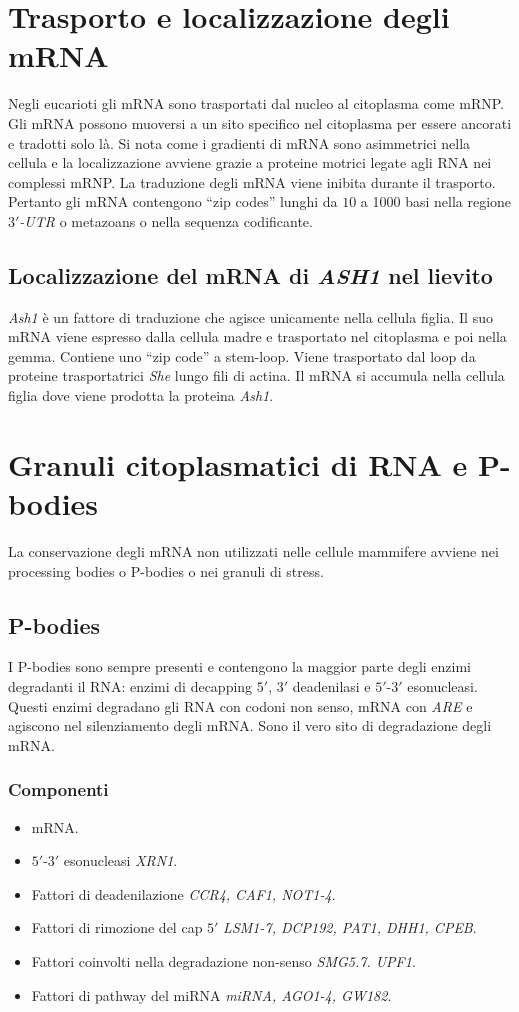 \section{Trasporto e localizzazione degli mRNA}
Negli eucarioti gli mRNA sono trasportati dal nucleo al citoplasma come mRNP. Gli mRNA possono muoversi a un sito specifico nel citoplasma per essere ancorati e tradotti solo l\`a. Si nota come i gradienti
di mRNA sono asimmetrici nella cellula e la localizzazione avviene grazie a proteine motrici legate agli RNA nei complessi mRNP. La traduzione degli mRNA viene inibita durante il trasporto. Pertanto
gli mRNA contengono ``zip codes'' lunghi da $10$ a \num{1000} basi nella regione \emph{$3'$-UTR} o metazoans o nella sequenza codificante.
\subsection{Localizzazione del mRNA di \emph{ASH1} nel lievito}
\emph{Ash1} \`e un fattore di traduzione che agisce unicamente nella cellula figlia. Il suo mRNA viene espresso dalla cellula madre e trasportato nel citoplasma e poi nella gemma. Contiene uno ``zip 
code'' a stem-loop. Viene trasportato dal loop da proteine trasportatrici \emph{She} lungo fili di actina. Il mRNA si accumula nella cellula figlia dove viene prodotta la proteina \emph{Ash1}. 
\section{Granuli citoplasmatici di RNA e P-bodies}
La conservazione degli mRNA non utilizzati nelle cellule mammifere avviene nei processing bodies o P-bodies o nei granuli di stress.
\subsection{P-bodies}
I P-bodies sono sempre presenti e contengono la maggior parte degli enzimi degradanti il RNA: enzimi di decapping $5'$, $3'$ deadenilasi e $5'$-$3'$ esonucleasi. Questi enzimi degradano gli RNA con 
codoni non senso, mRNA con \emph{ARE} e agiscono nel silenziamento degli mRNA. Sono il vero sito di degradazione degli mRNA. 
\subsubsection{Componenti}
\begin{multicols}{2}
\begin{itemize}
	\item mRNA.
	\item $5'$-$3'$ esonucleasi \emph{XRN1}.
	\item Fattori di deadenilazione \emph{CCR4, CAF1, NOT1-4}.
	\columnbreak
	\item Fattori di rimozione del cap $5'$ \emph{LSM1-7, DCP192, PAT1, DHH1, CPEB}.
	\item Fattori coinvolti nella degradazione non-senso \emph{SMG5.7. UPF1}.
	\item Fattori di pathway del miRNA \emph{miRNA, AGO1-4, GW182}.
\end{itemize}
\end{multicols}
